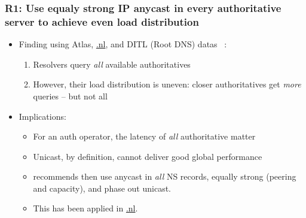 \documentclass[11pt,show 
notes,notheorems,noamsthm,blank]{beamer} %
\begin{document}
\begin{frame}
 \frametitle{R1: Use equaly strong IP anycast in every authoritative server to
    achieve even load distribution}
    
\begin{itemize}
\item Finding using Atlas, \url{.nl}, and DITL (Root DNS) 
datas~\cite{Mueller17b} : 

\begin{enumerate}
                \item Resolvers query \textit{all} available authoritatives
                \item However, their load distribution is uneven: closer 
authoritatives get \textit{more} queries -- but not all
               \end{enumerate}

\item Implications: 
\begin{itemize}
 \item For an auth operator, the latency of \textit{all} authoritative matter
  \item Unicast, by definition, cannot deliver good global performance 
  \item \cite{Mueller17b} recommends then use anycast in \textit{all} NS 
records, equally strong (peering and capacity), and phase out unicast.

\item This has been applied in \url{.nl}.
\end{itemize}


\end{itemize}


\end{frame}
 
\end{document}
